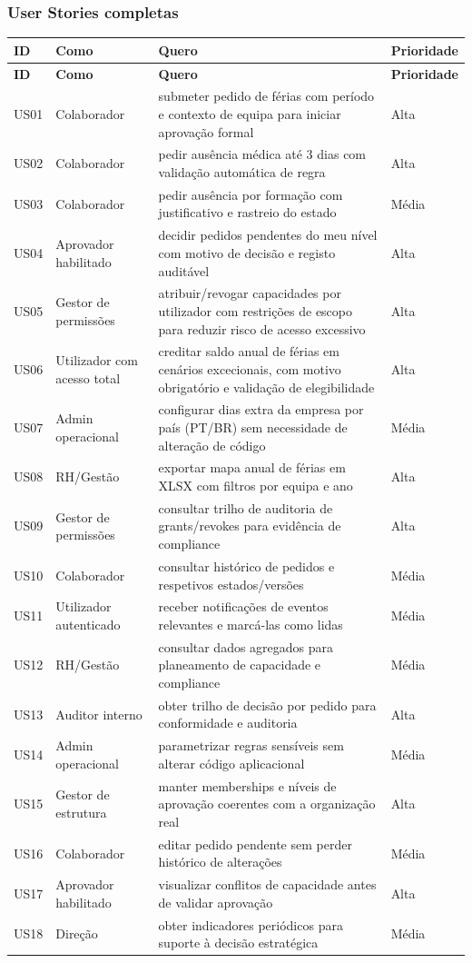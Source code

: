 \documentclass[11pt,a4paper]{article}
\begin{document}
\subsubsection{User Stories completas}
\begin{longtable}{p{1.2cm} p{5.0cm} p{7.0cm} p{2.0cm}}
\toprule
\textbf{ID} & \textbf{Como} & \textbf{Quero} & \textbf{Prioridade} \\
\midrule
\endfirsthead
\toprule
\textbf{ID} & \textbf{Como} & \textbf{Quero} & \textbf{Prioridade} \\
\midrule
\endhead
US01 & Colaborador & submeter pedido de férias com período e contexto de equipa para iniciar aprovação formal & Alta \\
US02 & Colaborador & pedir ausência médica até 3 dias com validação automática de regra & Alta \\
US03 & Colaborador & pedir ausência por formação com justificativo e rastreio do estado & Média \\
US04 & Aprovador habilitado & decidir pedidos pendentes do meu nível com motivo de decisão e registo auditável & Alta \\
US05 & Gestor de permissões & atribuir/revogar capacidades por utilizador com restrições de escopo para reduzir risco de acesso excessivo & Alta \\
US06 & Utilizador com acesso total & creditar saldo anual de férias em cenários excecionais, com motivo obrigatório e validação de elegibilidade & Alta \\
US07 & Admin operacional & configurar dias extra da empresa por país (PT/BR) sem necessidade de alteração de código & Média \\
US08 & RH/Gestão & exportar mapa anual de férias em XLSX com filtros por equipa e ano & Alta \\
US09 & Gestor de permissões & consultar trilho de auditoria de grants/revokes para evidência de compliance & Alta \\
US10 & Colaborador & consultar histórico de pedidos e respetivos estados/versões & Média \\
US11 & Utilizador autenticado & receber notificações de eventos relevantes e marcá-las como lidas & Média \\
US12 & RH/Gestão & consultar dados agregados para planeamento de capacidade e compliance & Média \\
US13 & Auditor interno & obter trilho de decisão por pedido para conformidade e auditoria & Alta \\
US14 & Admin operacional & parametrizar regras sensíveis sem alterar código aplicacional & Média \\
US15 & Gestor de estrutura & manter memberships e níveis de aprovação coerentes com a organização real & Alta \\
US16 & Colaborador & editar pedido pendente sem perder histórico de alterações & Média \\
US17 & Aprovador habilitado & visualizar conflitos de capacidade antes de validar aprovação & Alta \\
US18 & Direção & obter indicadores periódicos para suporte à decisão estratégica & Média \\
\bottomrule
\end{longtable}
\end{document}
